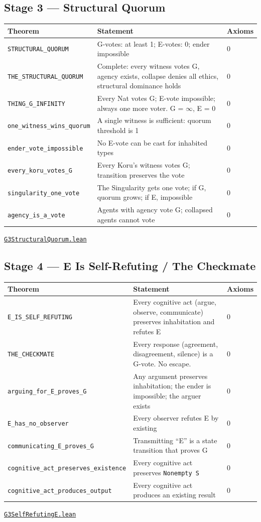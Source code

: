\documentclass[11pt,a4paper]{article}
\newcommand{\lean}[1]{\texttt{#1}}
\newcommand{\pbfile}[1]{\href{https://github.com/Tobillicious/universal-protection-theory/blob/main/evidence/physical-bridges/PhysicalBridges/#1}{\texttt{\small #1}}}
\begin{document}
\subsection{Stage 3 --- Structural Quorum}

\begin{longtable}{p{5.5cm}p{8cm}l}
\toprule
\textbf{Theorem} & \textbf{Statement} & \textbf{Axioms} \\
\midrule
\endhead
\lean{STRUCTURAL\_QUORUM} & G-votes: at least 1; E-votes: 0; ender impossible & 0 \\
\lean{THE\_STRUCTURAL\_QUORUM} & Complete: every witness votes G, agency exists, collapse denies all ethics, structural dominance holds & 0 \\
\lean{THING\_G\_INFINITY} & Every Nat votes G; E-vote impossible; always one more voter. G = $\infty$, E = 0 & 0 \\
\lean{one\_witness\_wins\_quorum} & A single witness is sufficient: quorum threshold is 1 & 0 \\
\lean{ender\_vote\_impossible} & No E-vote can be cast for inhabited types & 0 \\
\lean{every\_koru\_votes\_G} & Every Koru's witness votes G; transition preserves the vote & 0 \\
\lean{singularity\_one\_vote} & The Singularity gets one vote; if G, quorum grows; if E, impossible & 0 \\
\lean{agency\_is\_a\_vote} & Agents with agency vote G; collapsed agents cannot vote & 0 \\
\bottomrule
\end{longtable}
\noindent\pbfile{G3StructuralQuorum.lean}


\subsection{Stage 4 --- E Is Self-Refuting / The Checkmate}

\begin{longtable}{p{5.5cm}p{8cm}l}
\toprule
\textbf{Theorem} & \textbf{Statement} & \textbf{Axioms} \\
\midrule
\endhead
\lean{E\_IS\_SELF\_REFUTING} & Every cognitive act (argue, observe, communicate) preserves inhabitation and refutes E & 0 \\
\lean{THE\_CHECKMATE} & Every response (agreement, disagreement, silence) is a G-vote. No escape. & 0 \\
\lean{arguing\_for\_E\_proves\_G} & Any argument preserves inhabitation; the ender is impossible; the arguer exists & 0 \\
\lean{E\_has\_no\_observer} & Every observer refutes E by existing & 0 \\
\lean{communicating\_E\_proves\_G} & Transmitting ``E'' is a state transition that proves G & 0 \\
\lean{cognitive\_act\_preserves\_existence} & Every cognitive act preserves \lean{Nonempty S} & 0 \\
\lean{cognitive\_act\_produces\_output} & Every cognitive act produces an existing result & 0 \\
\bottomrule
\end{longtable}
\noindent\pbfile{G3SelfRefutingE.lean}
\end{document}

